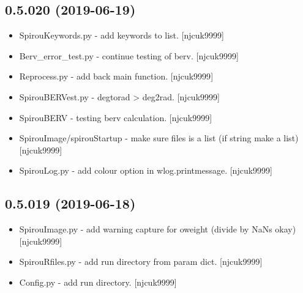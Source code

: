 \documentclass[a4paper,10pt,english]{report}
\begin{document}
\subsection{0.5.020 (2019-06-19)}
\label{\detokenize{misc/changelog:id115}}\begin{itemize}
\item {} 
SpirouKeywords.py - add keywords to list. {[}njcuk9999{]}

\item {} 
Berv\_error\_test.py - continue testing of berv. {[}njcuk9999{]}

\item {} 
Reprocess.py - add back main function. {[}njcuk9999{]}

\item {} 
SpirouBERVest.py - degtorad \textendash{}\textgreater{} deg2rad. {[}njcuk9999{]}

\item {} 
SpirouBERV - testing berv calculation. {[}njcuk9999{]}

\item {} 
SpirouImage/spirouStartup - make sure files is a list (if string make
a list) {[}njcuk9999{]}

\item {} 
SpirouLog.py - add colour option in wlog.printmessage. {[}njcuk9999{]}

\end{itemize}


\subsection{0.5.019 (2019-06-18)}
\label{\detokenize{misc/changelog:id116}}\begin{itemize}
\item {} 
SpirouImage.py - add warning capture for oweight (divide by NaNs okay)
{[}njcuk9999{]}

\item {} 
SpirouRfiles.py - add run directory from param dict. {[}njcuk9999{]}

\item {} 
Config.py - add run directory. {[}njcuk9999{]}

\end{itemize}
\end{document}
